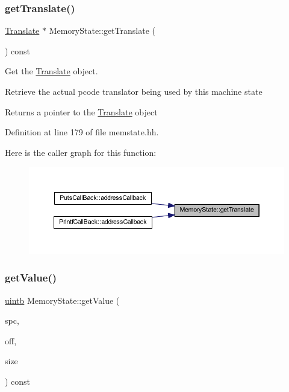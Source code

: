 \subsubsection{\texorpdfstring{getTranslate()}{getTranslate()}}
{\footnotesize\ttfamily \mbox{\hyperlink{class_translate}{Translate}} $\ast$ Memory\+State\+::get\+Translate (\begin{DoxyParamCaption}\item[{void}]{ }\end{DoxyParamCaption}) const\hspace{0.3cm}{\ttfamily [inline]}}



Get the \mbox{\hyperlink{class_translate}{Translate}} object. 

Retrieve the actual pcode translator being used by this machine state \begin{DoxyReturn}{Returns}
a pointer to the \mbox{\hyperlink{class_translate}{Translate}} object 
\end{DoxyReturn}


Definition at line 179 of file memstate.\+hh.

Here is the caller graph for this function\+:
\nopagebreak
\begin{figure}[H]
\begin{center}
\leavevmode
\includegraphics[width=350pt]{class_memory_state_aefbe63d695c36756cbc16d09bea76677_icgraph}
\end{center}
\end{figure}
\mbox{\label{class_memory_state_ae4d10a6ac34ebd96017915c5b6a39375}} 
\subsubsection{\texorpdfstring{getValue()}{getValue()}\hspace{0.1cm}{\footnotesize\ttfamily [1/3]}}
{\footnotesize\ttfamily \mbox{\hyperlink{types_8h_a2db313c5d32a12b01d26ac9b3bca178f}{uintb}} Memory\+State\+::get\+Value (\begin{DoxyParamCaption}\item[{\mbox{\hyperlink{class_addr_space}{Addr\+Space}} $\ast$}]{spc,  }\item[{\mbox{\hyperlink{types_8h_a2db313c5d32a12b01d26ac9b3bca178f}{uintb}}}]{off,  }\item[{int4}]{size }\end{DoxyParamCaption}) const}



